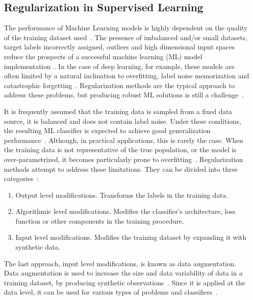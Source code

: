 \documentclass[parskip=full]{scrartcl}
\begin{document}
\subsection{Regularization in Supervised Learning}

The performance of Machine Learning models is highly dependent on the quality
of the training dataset used~\cite{Fenza2021, Halevy2009}. The presence of
imbalanced and/or small datasets, target labels incorrectly assigned, outliers
and high dimensional input spaces reduce the prospects of a successful machine
learning (ML) model implementation~\cite{Halevy2009, Domingos2012,
Salman2019}. In the case of deep learning, for example, these
models are often limited by a natural inclination to overfitting, label noise
memorization and catastrophic forgetting~\cite{Xie2021}. Regularization
methods are the typical approach to address these problems, but producing
robust ML solutions is still a challenge~\cite{Zhang2021}.

It is frequently assumed that the training data is sampled from a fixed data
source, it is balanced and does not contain label noise. Under these
conditions, the resulting ML classifier is expected to achieve good
generalization performance~\cite{benning2018modern}. Although, in practical
applications, this is rarely the case. When the training data is not
representative of the true population, or the model is over-parametrized, it
becomes particularly prone to overfitting~\cite{Bartlett2021}. Regularization
methods attempt to address these limitations. They can be divided into three
categories~\cite{santos2022avoiding}:

\begin{enumerate}
    \item Output level modifications. Transforms the labels in the training
        data.
    \item Algorithmic level modifications. Modifies the classifier's
        architecture, loss function or other components in the training
        procedure.
    \item Input level modifications. Modifies the training dataset by expanding it
        with synthetic data.
\end{enumerate}

The last approach, input level modifications, is known as data augmentation.
Data augmentation is used to increase the size and data variability of data in
a training dataset, by producing synthetic observations~\cite{Van2001,
Wong2016}. Since it is applied at the data level, it can be used for various
types of problems and classifiers~\cite{Behpour2019}. 
\end{document}
